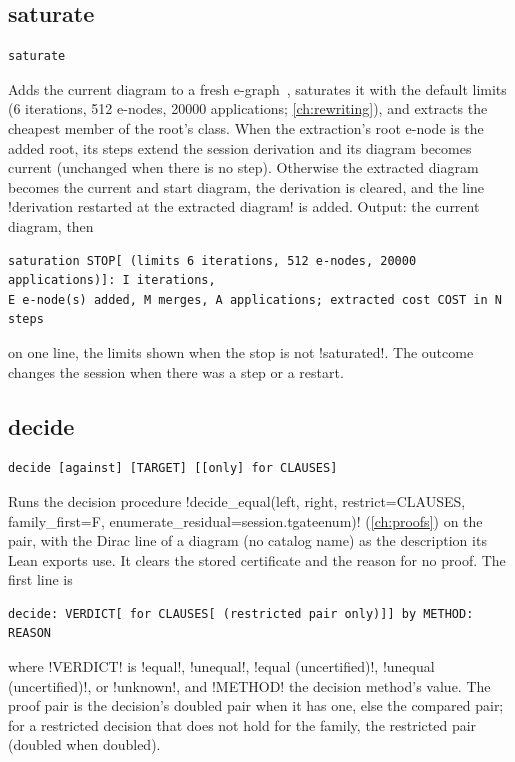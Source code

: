 \subsection{saturate}

\begin{lstlisting}[style=azx]
saturate
\end{lstlisting}
Adds the current diagram to a fresh e-graph~\cite{willsey2021egg}, saturates it with the default limits (6 iterations, 512 e-nodes, 20000 applications; \cref{ch:rewriting}), and extracts the cheapest member of the root's class. When the extraction's root e-node is the added root, its steps extend the session derivation and its diagram becomes current (unchanged when there is no step). Otherwise the extracted diagram becomes the current and start diagram, the derivation is cleared, and the line \code!derivation restarted at the extracted diagram! is added. Output: the current diagram, then
\begin{lstlisting}[style=grammar]
saturation STOP[ (limits 6 iterations, 512 e-nodes, 20000 applications)]: I iterations,
E e-node(s) added, M merges, A applications; extracted cost COST in N steps
\end{lstlisting}
on one line, the limits shown when the stop is not \code!saturated!. The outcome changes the session when there was a step or a restart.

\subsection{decide}\label{sec:language-decide}

\begin{lstlisting}[style=azx]
decide [against] [TARGET] [[only] for CLAUSES]
\end{lstlisting}
Runs the decision procedure \py!decide_equal(left, right, restrict=CLAUSES, family_first=F, enumerate_residual=session.tgateenum)! (\cref{ch:proofs}) on the pair, with the Dirac line of a diagram (no catalog name) as the description its Lean exports use. It clears the stored certificate and the reason for no proof. The first line is
\begin{lstlisting}[style=grammar]
decide: VERDICT[ for CLAUSES[ (restricted pair only)]] by METHOD: REASON
\end{lstlisting}
where \code!VERDICT! is \code!equal!, \code!unequal!, \code!equal (uncertified)!, \code!unequal (uncertified)!, or \code!unknown!, and \code!METHOD! the decision method's value. The proof pair is the decision's doubled pair when it has one, else the compared pair; for a restricted decision that does not hold for the family, the restricted pair (doubled when doubled).

